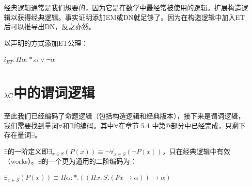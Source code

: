\documentclass[UTF8]{article}
\makeatletter
\newcommand{\Rmnum}[1]{\expandafter\@slowromancap\romannumeral #1@}
\makeatother
\begin{document}
		经典逻辑通常是我们想要的，因为它是在数学中最经常被使用的逻辑。扩展构造逻辑以获得经典逻辑。事实证明添加EM或DN就足够了。因为在构造逻辑中加入ET后可以推导出DN，反之亦然。
		
		以声明的方式添加ET公理：
		
		$i_{ET}:\Pi\alpha:*.\alpha\lor\neg\alpha$
		
	\section{$\lambda{\rm C}$中的谓词逻辑}
	\noindent
	至此我们已经编码了命题逻辑（包括构造逻辑和经典版本），接下来是谓词逻辑，我们需要找到量词$\forall$和$\exists$的编码。其中$\forall$在章节 5.4 中第\Rmnum{5}部分中已经完成，只剩下存在量词$\exists$。
	
		$\exists$的一阶定义即$\exists_{x\in S}(P(x))\equiv\neg\forall_{x\in S}(\neg P(x))$，只在经典逻辑中有效（works）。$\exists$的一个更为通用的二阶编码为：
		
		$\exists_{x\in S}(P(x))\equiv\Pi\alpha:*.((\Pi x:S.(Px\rightarrow\alpha))\rightarrow\alpha)$
\end{document}
